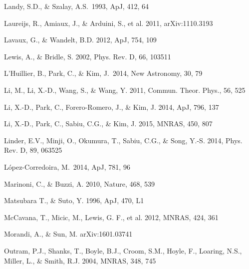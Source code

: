 \documentclass[iop]{emulateapj}
\begin{document}
\begin{thebibliography}{}
Landy, S.D., \& Szalay, A.S.\ 1993, ApJ, 412, 64 

Laureijs, R., Amiaux, J., \& Arduini, S., et al. 2011, arXiv:1110.3193

Lavaux, G., \& Wandelt, B.D. 2012, ApJ, 754, 109  


Lewis, A., \& Bridle, S. 2002, Phys. Rev. D, 66, 103511

L'Huillier, B., Park, C., \& Kim, J.\ 2014, New Astronomy, 30, 79 

Li, M., Li, X.-D., Wang, S., \& Wang, Y. 2011, Commun. Theor. Phys., 56, 525

Li, X.-D., Park, C., Forero-Romero, J., \& Kim, J. 2014, ApJ, 796, 137

Li, X.-D., Park, C., Sabiu, C.G., \& Kim, J. 2015, MNRAS, 450, 807 


Linder, E.V., Minji, O., Okumura, T., Sabiu, C.G., \& Song, Y.-S. 2014, Phys. Rev. D, 89, 063525  

L{\'o}pez-Corredoira, M.\ 2014, ApJ, 781, 96 

Marinoni, C., \& Buzzi, A. 2010, Nature, 468, 539  

Matsubara T., \& Suto, Y. 1996, ApJ, 470, L1  

McCavana, T., Micic, M., Lewis, G. F., et al. 2012, MNRAS, 424, 361


Morandi, A., \& Sun, M. arXiv:1601.03741


Outram, P.J., Shanks, T., Boyle, B.J., Croom, S.M., Hoyle, F., Loaring, N.S., 
Miller, L., \& Smith, R.J. 2004, MNRAS, 348, 745  



\end{thebibliography}
\end{document}
